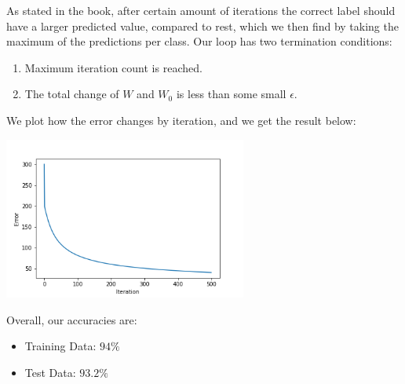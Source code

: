 \documentclass[12pt,reqno]{amsart}
\begin{document}
As stated in the book, after certain amount of iterations the correct label should have a larger predicted value, compared to rest, which we then find by taking the maximum of the predictions per class. Our loop has two termination conditions:
\begin{enumerate}
\item Maximum iteration count is reached.
\item The total change of $W$ and $W_0$ is less than some small $\epsilon$.
\end{enumerate}

We plot how the error changes by iteration, and we get the result below: \\
\begin{centering}
\includegraphics[width=0.6\textwidth]{plot.png}
\end{centering}

Overall, our accuracies are: 
\begin{itemize}
\item Training Data: $94\%$
\item Test Data: $93.2\%$
\end{itemize}
\end{document}
